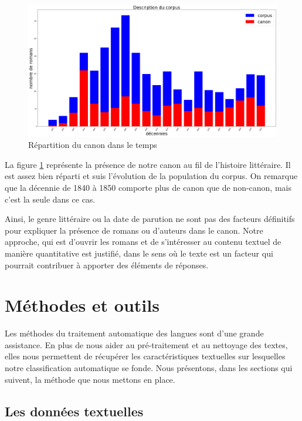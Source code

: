 \bigskip
\begin{figure}[!ht]
    \centering
    \includegraphics[width=15cm]{img/04_corpus_bar.png}
    \caption{Répartition du canon dans le temps}
    \label{corpus_bar_temps}
\end{figure}

La figure \ref{corpus_bar_temps} représente la présence de notre canon au fil de l'histoire littéraire. Il est assez bien réparti et suis l'évolution de la population du corpus. On remarque que la décennie de 1840 à 1850 comporte plus de canon que de non-canon, mais c'est la seule dans ce cas.

Ainsi, le genre littéraire ou la date de parution ne sont pas des facteurs définitifs pour expliquer la présence de romans ou d'auteurs dans le canon. Notre approche, qui est d'ouvrir les romans et de s'intéresser au contenu textuel de manière quantitative est justifié, dans le sens où le texte est un facteur qui pourrait contribuer à apporter des éléments de réponses. 


\chapter{Méthodes et outils}

Les méthodes du traitement automatique des langues sont d'une grande assistance. En plus de nous aider au pré-traitement et au nettoyage des textes, elles nous permettent de récupérer les caractéristiques textuelles sur lesquelles notre classification automatique se fonde. Nous présentons, dans les sections qui suivent, la méthode que nous mettons en place.

\section{Les données textuelles}

